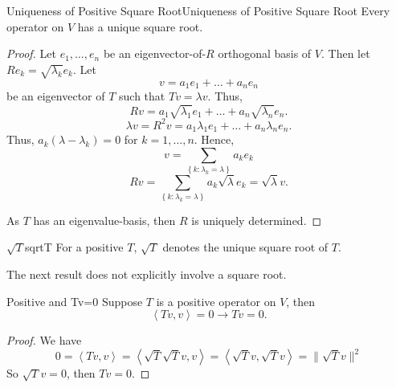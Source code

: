 \documentclass[../main.tex]{subfiles}
\begin{document}
\begin{corollary}{Uniqueness of Positive Square Root}{Uniqueness of Positive Square Root}
Every operator on $V$ has a unique square root.
\end{corollary}
\begin{proof}
Let $e_1, \ldots ,e_n$ be an eigenvector-of-$R$ orthogonal basis of $V$. Then let $Re_k = \sqrt{\lambda_k}e_k$. Let
\begin{equation*}
v = a_1e_1+\ldots +a_ne_n
\end{equation*}
be an eigenvector of $T$ such that $Tv=\lambda v$. Thus,
\begin{equation*}
Rv = a_1 \sqrt{\lambda_1}e_1+\ldots +a_n \sqrt{\lambda_n}e_n.
\end{equation*}
\begin{equation*}
\lambda v = R^2v = a_1 \lambda_1 e_1+\ldots +a_n \lambda_n e_n.
\end{equation*}
Thus, $a_k(\lambda-\lambda_k) = 0$ for $k=1, \ldots ,n$. Hence,
\begin{equation*}
v = \sum_{\left\{ k: \lambda_k= \lambda \right\}} a_ke_k 
\end{equation*}
\begin{equation*}
Rv = \sum_{\left\{ k: \lambda_k=\lambda \right\}} a_k \sqrt{\lambda}e_k = \sqrt{\lambda}v .
\end{equation*}

As $T$ has an eigenvalue-basis, then $R$ is uniquely determined.
\end{proof}

\begin{notation}{$\sqrt{T}$}{sqrtT}
For a positive $T$, $\sqrt{T}$ denotes the unique square root of $T$. 
\end{notation}

The next result does not explicitly involve a square root.
\begin{theorem}{}{Positive and Tv=0}
Suppose $T$ is a positive operator on $V$, then
\begin{equation*}
\left<Tv,v\right> =0 \rightarrow Tv=0.
\end{equation*}
\end{theorem}
\begin{proof}
We have
\begin{equation*}
0 = \left<Tv,v\right> = \left<\sqrt{T}\sqrt{T}v,v\right> = \left<\sqrt{T}v,\sqrt{T}v\right> = \|\sqrt{T}v\|^2
\end{equation*}
So $\sqrt{T}v=0$, then $Tv = 0$.
\end{proof}
\end{document}
